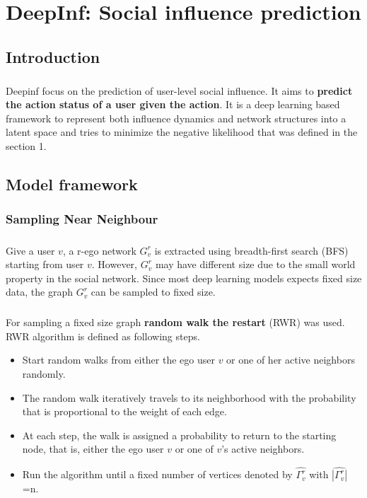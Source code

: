 \chapter{DeepInf: Social influence prediction}


\section{Introduction}
\paragraph{} Deepinf focus on the prediction of user-level social influence. It aims to \textbf{predict the action status of a user given the action}.
It is a deep learning based framework to represent both influence dynamics and network structures into a latent space and 
tries to minimize the negative likelihood that was defined in the section 1.


\section{Model framework}
\subsection{Sampling Near Neighbour}

\paragraph{} Give a user $v$, a r-ego network $G_v^r$ is extracted using breadth-first search (BFS) starting from 
user $v$. However, $G_v^r$ may have different size due to the small world property in the social network. Since most
deep learning models expects fixed size data, the graph $G_v^r$ can be sampled to fixed size.
\paragraph{} For sampling a fixed size graph \textbf{random walk the restart} (RWR) was used. RWR algorithm is defined as
following steps.

\begin{itemize}
    \item Start random walks from either the ego user $v$ or one of her active neighbors randomly.
    \item The random walk iteratively travels to its neighborhood with the probability that is 
    proportional to the weight of each edge.
    \item At each step, the walk is assigned a probability to return to the starting node, that is, 
    either the ego user $v$ or one of $v$’s active neighbors.
    \item Run the algorithm until a fixed number of vertices denoted by $\hat{\Gamma_v^r}$ with $\hat{|\Gamma_v^r|}$=n. 
\end{itemize}

